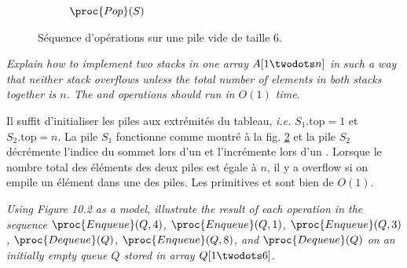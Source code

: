 \begin{description}
\begin{ex}
\begin{figure}[H]
\begin{subfigure}[t]{.45\textwidth}
        \caption{$\proc{Pop}(S)$}\label{fig:10_1-1_6}
      \end{subfigure}
      \caption{Séquence d'opérations sur une pile vide de taille 6.} 
      \label{fig:stack-seq} 
    \end{figure}
\end{ex}
 \textit{Explain how to implement two stacks in one array $A[1\twodots n]$ in such a way that neither stack overflows unless the total number of elements in both stacks together is $n$. The  and  operations should run in $O(1)$ time.}
\begin{ex}
  Il suffit d'initialiser les piles aux extrémités du tableau, \textit{i.e.} $S_1.\textrm{top} = 1$ et $S_2.\textrm{top} = n$. La pile $S_1$ fonctionne comme montré à la fig. \ref{fig:stack-seq} et la pile $S_2$ décrémente l'indice du sommet lors d'un  et l'incrémente lors d'un . Lorsque le nombre total des éléments des deux piles est égale à $n$, il y a overflow si on empile un élément dans une des piles. Les primitives  et  sont bien de $O(1)$.
\end{ex}
 \textit{Using Figure 10.2 as a model,  illustrate the result of each operation in the sequence $\proc{Enqueue}(Q, 4)$, $\proc{Enqueue}(Q, 1)$, $\proc{Enqueue}(Q, 3)$, $\proc{Dequeue}(Q)$,  $\proc{Enqueue}(Q, 8)$,  and $\proc{Dequeue}(Q)$ on an initially empty queue $Q$ stored in array $Q[1 \twodots 6]$.}
\begin{ex}
  

\end{ex}
\end{description}

